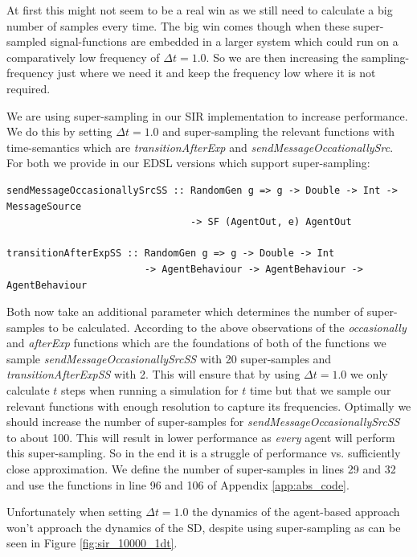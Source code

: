 At first this might not seem to be a real win as we still need to calculate a big number of samples every time. The big win comes though when these super-sampled signal-functions are embedded in a larger system which could run on a comparatively low frequency of $\Delta t = 1.0$. So we are then increasing the sampling-frequency just where we need it and keep the frequency low where it is not required.

We are using super-sampling in our SIR implementation to increase performance. We do this by setting $\Delta t = 1.0$ and super-sampling the relevant functions with time-semantics which are \textit{transitionAfterExp} and \textit{sendMessageOccationallySrc}. For both we provide in our EDSL versions which support super-sampling:

\begin{verbatim}
sendMessageOccasionallySrcSS :: RandomGen g => g -> Double -> Int -> MessageSource 
                                -> SF (AgentOut, e) AgentOut
                                
transitionAfterExpSS :: RandomGen g => g -> Double -> Int 
                        -> AgentBehaviour -> AgentBehaviour -> AgentBehaviour
\end{verbatim}

Both now take an additional parameter which determines the number of super-samples to be calculated. According to the above observations of the \textit{occasionally} and \textit{afterExp} functions which are the foundations of both of the functions we sample \textit{sendMessageOccasionallySrcSS} with 20 super-samples and \textit{transitionAfterExpSS} with 2. This will ensure that by using $\Delta t = 1.0$ we only calculate $t$ steps when running a simulation for $t$ time but that we sample our relevant functions with enough resolution to capture its frequencies. Optimally we should increase the number of super-samples for \textit{sendMessageOccasionallySrcSS} to about 100. This will result in lower performance as \textit{every} agent will perform this super-sampling. So in the end it is a struggle of performance vs. sufficiently close approximation. We define the number of super-samples in lines 29 and 32 and use the functions in line 96 and 106 of Appendix \ref{app:abs_code}.

Unfortunately when setting $\Delta t = 1.0$ the dynamics of the agent-based approach won't approach the dynamics of the SD, despite using super-sampling as can be seen in Figure \ref{fig:sir_10000_1dt}.

